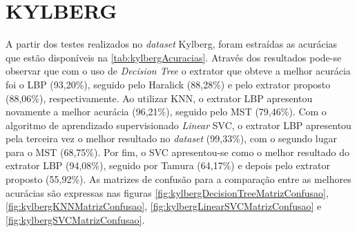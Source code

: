 \section{KYLBERG}
\label{sec:kylberg}

\par A partir dos testes realizados no \textit{dataset} Kylberg, foram estraídas as acurácias que estão disponíveis na \autoref{tab:kylbergAcuracias}. Através dos resultados pode-se observar que com o uso de \textit{Decision Tree} o extrator que obteve a melhor acurácia foi o LBP (93,20\%), seguido pelo Haralick (88,28\%) e pelo extrator proposto (88,06\%), respectivamente. Ao utilizar KNN, o extrator LBP apresentou novamente a melhor acurácia (96,21\%), seguido pelo MST (79,46\%). Com o algoritmo de aprendizado supervisionado \textit{Linear} SVC, o extrator LBP apresentou pela terceira vez o melhor resultado no \textit{dataset} (99,33\%), com o segundo lugar para o MST (68,75\%). Por fim, o SVC apresentou-se como o melhor resultado do extrator LBP (94,08\%), seguido por Tamura (64,17\%) e depois pelo extrator proposto (55,92\%). As matrizes de confusão para a comparação entre as melhores acurácias são expressas nas figuras \ref{fig:kylbergDecisionTreeMatrizConfusao}, \ref{fig:kylbergKNNMatrizConfusao}, \ref{fig:kylbergLinearSVCMatrizConfusao} e \ref{fig:kylbergSVCMatrizConfusao}.



